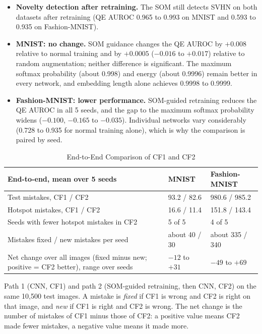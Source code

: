 \documentclass{scrartcl}
\begin{document}
\begin{itemize}
  \item \textbf{Novelty detection after retraining.} The SOM still detects SVHN on both datasets after retraining (QE AUROC 0.965 to 0.993 on MNIST and 0.593 to 0.935 on Fashion-MNIST).
  \item \textbf{MNIST: no change.} SOM guidance changes the QE AUROC by $+0.008$ relative to normal training and by $+0.0005$ ($-0.016$ to $+0.017$) relative to random augmentation; neither difference is significant. The maximum softmax probability (about 0.998) and energy (about 0.9996) remain better in every network, and embedding length alone achieves 0.9998 to 0.9999.
  \item \textbf{Fashion-MNIST: lower performance.} SOM-guided retraining reduces the QE AUROC in all 5 seeds, and the gap to the maximum softmax probability widens ($-0.100$, $-0.165$ to $-0.035$). Individual networks vary considerably (0.728 to 0.935 for normal training alone), which is why the comparison is paired by seed.
\end{itemize}

\begin{table}[H]
\centering
\caption{End-to-End Comparison of CF1 and CF2}
\label{tab:endtoend}
\renewcommand{\arraystretch}{1.12}
\footnotesize
\begin{tabular}{|L{0.44\textwidth}|C{0.22\textwidth}|C{0.22\textwidth}|}
\hline
\textbf{End-to-end, mean over 5 seeds} & \textbf{MNIST} & \textbf{Fashion-MNIST} \\ \hline
Test mistakes, CF1 / CF2 & 93.2 / 82.6 & 980.6 / 985.2 \\ \hline
Hotspot mistakes, CF1 / CF2 & 16.6 / 11.4 & 151.8 / 143.4 \\ \hline
Seeds with fewer hotspot mistakes in CF2 & 5 of 5 & 4 of 5 \\ \hline
Mistakes fixed / new mistakes per seed & about 40 / 30 & about 335 / 340 \\ \hline
Net change over all images (fixed minus new; positive = CF2 better), range over seeds & $-12$ to $+31$ & $-49$ to $+69$ \\ \hline
\end{tabular}

\par\vspace{3pt}
{\footnotesize\raggedright\noindent Path 1 (CNN, CF1) and path 2 (SOM-guided retraining, then CNN, CF2) on the same 10,500 test images. A mistake is \emph{fixed} if CF1 is wrong and CF2 is right on that image, and \emph{new} if CF1 is right and CF2 is wrong. The net change is the number of mistakes of CF1 minus those of CF2: a positive value means CF2 made fewer mistakes, a negative value means it made more.\par}
\end{table}
\end{document}
